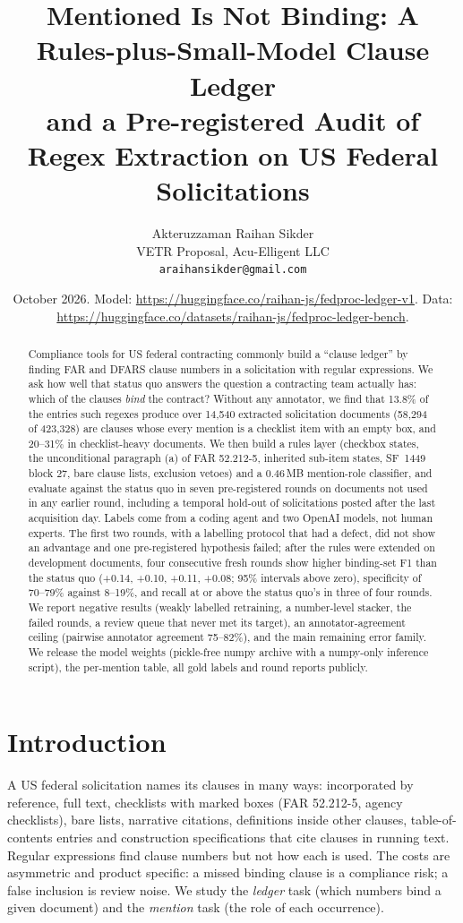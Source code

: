 \documentclass[11pt]{article}
\title{Mentioned Is Not Binding: A Rules-plus-Small-Model Clause Ledger\\ and a Pre-registered Audit of Regex Extraction on US Federal Solicitations}
\author{Akteruzzaman Raihan Sikder\\ VETR Proposal, Acu-Elligent LLC\\ \small\texttt{araihansikder@gmail.com}}
\date{October 2026. Model: \url{https://huggingface.co/raihan-js/fedproc-ledger-v1}. Data: \url{https://huggingface.co/datasets/raihan-js/fedproc-ledger-bench}.}
\begin{document}
\maketitle

\begin{abstract}
Compliance tools for US federal contracting commonly build a ``clause ledger'' by finding FAR and DFARS clause numbers in a solicitation with regular expressions. We ask how well that status quo answers the question a contracting team actually has: which of the clauses \emph{bind} the contract? Without any annotator, we find that 13.8\% of the entries such regexes produce over 14{,}540 extracted solicitation documents (58{,}294 of 423{,}328) are clauses whose every mention is a checklist item with an empty box, and 20--31\% in checklist-heavy documents. We then build a rules layer (checkbox states, the unconditional paragraph (a) of FAR 52.212-5, inherited sub-item states, SF~1449 block 27, bare clause lists, exclusion vetoes) and a 0.46\,MB mention-role classifier, and evaluate against the status quo in seven pre-registered rounds on documents not used in any earlier round, including a temporal hold-out of solicitations posted after the last acquisition day. Labels come from a coding agent and two OpenAI models, not human experts. The first two rounds, with a labelling protocol that had a defect, did not show an advantage and one pre-registered hypothesis failed; after the rules were extended on development documents, four consecutive fresh rounds show higher binding-set F1 than the status quo (+0.14, +0.10, +0.11, +0.08; 95\% intervals above zero), specificity of 70--79\% against 8--19\%, and recall at or above the status quo's in three of four rounds. We report negative results (weakly labelled retraining, a number-level stacker, the failed rounds, a review queue that never met its target), an annotator-agreement ceiling (pairwise annotator agreement 75--82\%), and the main remaining error family. We release the model weights (pickle-free numpy archive with a numpy-only inference script), the per-mention table, all gold labels and round reports publicly.
\end{abstract}

\section{Introduction}
A US federal solicitation names its clauses in many ways: incorporated by reference, full text, checklists with marked boxes (FAR 52.212-5, agency checklists), bare lists, narrative citations, definitions inside other clauses, table-of-contents entries and construction specifications that cite clauses in running text. Regular expressions find clause numbers but not how each is used. The costs are asymmetric and product specific: a missed binding clause is a compliance risk; a false inclusion is review noise. We study the \emph{ledger} task (which numbers bind a given document) and the \emph{mention} task (the role of each occurrence).
\end{document}
